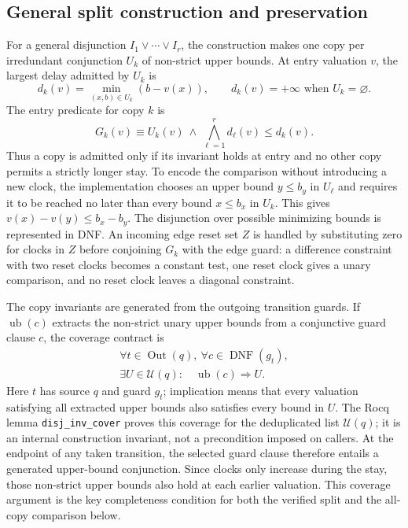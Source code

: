 \documentclass{ieeeaccess}
\begin{document}
\subsection{General split construction and preservation}
\label{subsec:split-construction}
For a general disjunction $I_1\lor\cdots\lor I_r$, the construction makes
one copy per irredundant conjunction $U_k$ of non-strict upper bounds. At
entry valuation $v$, the largest delay admitted by $U_k$ is
\[
 d_k(v)=\min_{(x,b)\in U_k}(b-v(x)),
 \qquad d_k(v)=+\infty\text{ when }U_k=\varnothing.
\]
The entry predicate for copy $k$ is
\[
 G_k(v)\equiv U_k(v)\ \land\ \bigwedge_{\ell=1}^{r} d_\ell(v)\le d_k(v).
\]
Thus a copy is admitted only if its invariant holds at entry and no other
copy permits a strictly longer stay. To encode the comparison without
introducing a new clock, the implementation chooses an upper bound
$y\le b_y$ in $U_\ell$ and requires it to be reached no later than every
bound $x\le b_x$ in $U_k$. This gives $v(x)-v(y)\le b_x-b_y$. The
disjunction over possible minimizing bounds is represented in DNF. An
incoming edge reset set $Z$ is handled by substituting zero for clocks in
$Z$ before conjoining $G_k$ with the edge guard: a difference constraint
with two reset clocks becomes a constant test, one reset clock gives a unary
comparison, and no reset clock leaves a diagonal constraint.

The copy invariants are generated from the outgoing transition guards. If
$\operatorname{ub}(c)$ extracts the non-strict unary upper bounds from a
conjunctive guard clause $c$, the coverage contract is
\[
\begin{gathered}
\forall t\in\operatorname{Out}(q),\ \forall c\in\operatorname{DNF}(g_t),\\
\exists U\in\mathcal U(q):\quad \operatorname{ub}(c)\Rightarrow U.
\end{gathered}
\]
Here $t$ has source $q$ and guard $g_t$; implication means that every
valuation satisfying all extracted upper bounds also satisfies every bound
in $U$. The Rocq lemma \texttt{disj\_inv\_cover} proves this coverage for
the deduplicated list $\mathcal U(q)$; it is an internal construction
invariant, not a precondition imposed on callers. At the endpoint of any taken
transition, the selected guard clause therefore entails a generated
upper-bound conjunction. Since clocks only increase during the stay, those
non-strict upper bounds also hold at each earlier valuation. This coverage
argument is the key completeness condition for both the verified split and
the all-copy comparison below.
\end{document}
